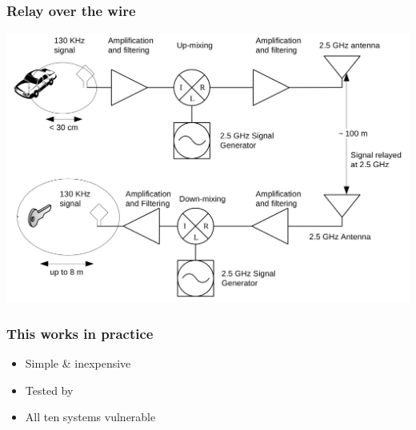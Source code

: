 \documentclass[12pt]{beamer}
\begin{document}
	\begin{frame}
		\frametitle{Relay over the wire}
		\begin{center}
			\includegraphics[scale=0.75]{img/franc_relay_over_the_air.png} 	
		\end{center}
	\end{frame}

	\begin{frame}
		\frametitle{This works in practice}
		\begin{itemize}
			\item Simple \& inexpensive
			\item Tested by \citet*{relayAttacksFranc}
			\item All ten systems vulnerable
		\end{itemize}
	\end{frame}
\end{document}
